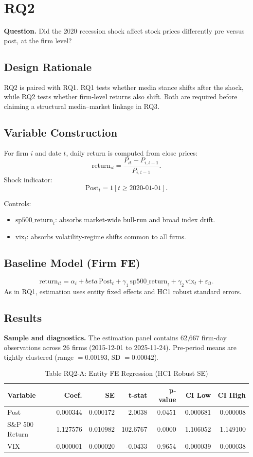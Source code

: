 \documentclass[11pt]{article}
\def\beta{beta}%
\def\mathbb#1{#1}%
\begin{document}
\section*{RQ2}
\textbf{Question.} Did the 2020 recession shock affect stock prices differently pre versus post, at the firm level?

\subsection*{Design Rationale}
RQ2 is paired with RQ1. RQ1 tests whether media stance shifts after the shock, while RQ2 tests whether firm-level returns also shift. Both are required before claiming a structural media--market linkage in RQ3.

\subsection*{Variable Construction}
For firm $i$ and date $t$, daily return is computed from close prices:
\[
\text{return}_{it}=\frac{P_{it}-P_{i,t-1}}{P_{i,t-1}}.
\]
Shock indicator:
\[
\text{Post}_t=\mathbb{1}[t\ge\text{2020-01-01}].
\]

Controls:
\begin{itemize}[leftmargin=1.5em]
\item $\text{sp500\_return}_t$: absorbs market-wide bull-run and broad index drift.
\item $\text{vix}_t$: absorbs volatility-regime shifts common to all firms.
\end{itemize}

\subsection*{Baseline Model (Firm FE)}
\[
\text{return}_{it}=\alpha_i+\beta\,\text{Post}_t+\gamma_1\,\text{sp500\_return}_t+\gamma_2\,\text{vix}_t+\varepsilon_{it}.
\]
As in RQ1, estimation uses entity fixed effects and HC1 robust standard errors.

\subsection*{Results}
\textbf{Sample and diagnostics.} The estimation panel contains 62,667 firm-day observations across 26 firms (2015-12-01 to 2025-11-24). Pre-period means are tightly clustered (range $=0.00193$, SD $=0.00042$).

\begin{table}[ht]
\centering
\caption*{Table RQ2-A: Entity FE Regression (HC1 Robust SE)}
\begin{tabular}{lrrrrrr}
\toprule
Variable & Coef. & SE & t-stat & p-value & CI Low & CI High \\
\midrule
Post & -0.000344 & 0.000172 & -2.0038 & 0.0451 & -0.000681 & -0.000008 \\
S\&P 500 Return & 1.127576 & 0.010982 & 102.6767 & 0.0000 & 1.106052 & 1.149100 \\
VIX & -0.000001 & 0.000020 & -0.0433 & 0.9654 & -0.000039 & 0.000038 \\
\bottomrule
\end{tabular}
\end{table}
\end{document}
